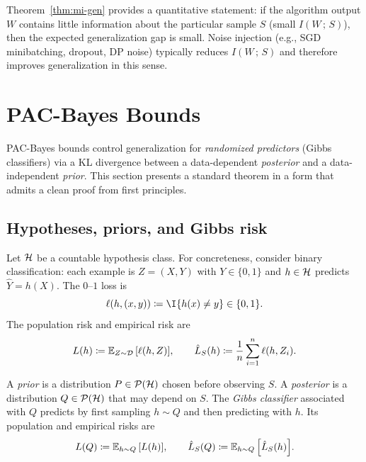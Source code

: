 \documentclass{article}
\numberwithin{equation}{section}
\newcommand{\mathify}[1]{\ifmmode{#1}\else\mbox{$#1$}\fi}
\newcommand{\Esub}[2]{\mathify{\mathbb{E}_{#1}\left[#2\right]}}
\newcommand{\MI}[2]{I\!\left(#1\,;\,#2\right)}
\newcommand{\cD}{{\cal D}}
\newcommand{\cH}{{\cal H}}
\newcommand{\cP}{{\cal P}}
\begin{document}
\begin{remark}[Interpretation]
Theorem~\ref{thm:mi-gen} provides a quantitative statement:
if the algorithm output $W$ contains little information about the particular sample $S$ (small $\MI{W}{S}$), then the expected generalization gap is small.
Noise injection (e.g., SGD minibatching, dropout, DP noise) typically reduces $\MI{W}{S}$ and therefore improves generalization in this sense.
\end{remark}

\section{PAC-Bayes Bounds}
\label{sec:pac-bayes}

PAC-Bayes bounds control generalization for \emph{randomized predictors} (Gibbs classifiers) via a KL divergence between a data-dependent \emph{posterior} and a data-independent \emph{prior}.
This section presents a standard theorem in a form that admits a clean proof from first principles.

\subsection{Hypotheses, priors, and Gibbs risk}

Let $\cH$ be a countable hypothesis class.
For concreteness, consider binary classification: each example is $Z=(X,Y)$ with $Y\in\{0,1\}$ and $h\in\cH$ predicts $\hat Y=h(X)$.
The $0$--$1$ loss is
\begin{equation}
    \ell(h,(x,y)) \coloneqq \I{h(x)\neq y} \in \{0,1\}.
\end{equation}
The population risk and empirical risk are
\begin{equation}
    L(h) \coloneqq \Esub{Z\sim\cD}{\ell(h,Z)},
    \qquad
    \hat L_S(h) \coloneqq \frac1n\sum_{i=1}^n \ell(h,Z_i).
\end{equation}

\begin{definition}
A \emph{prior} is a distribution $P\in\cP(\cH)$ chosen before observing $S$.
A \emph{posterior} is a distribution $Q\in\cP(\cH)$ that may depend on $S$.
The \emph{Gibbs classifier} associated with $Q$ predicts by first sampling $h\sim Q$ and then predicting with $h$.
Its population and empirical risks are
\begin{equation}
    L(Q) \coloneqq \Esub{h\sim Q}{L(h)},
    \qquad
    \hat L_S(Q) \coloneqq \Esub{h\sim Q}{\hat L_S(h)}.
\end{equation}
\end{definition}
\end{document}
